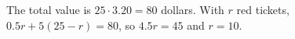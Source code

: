 The total value is $25\cdot3.20=80$ dollars. With $r$ red tickets, $0.5r+5(25-r)=80$, so $4.5r=45$ and $r=\boxed{10}$.
